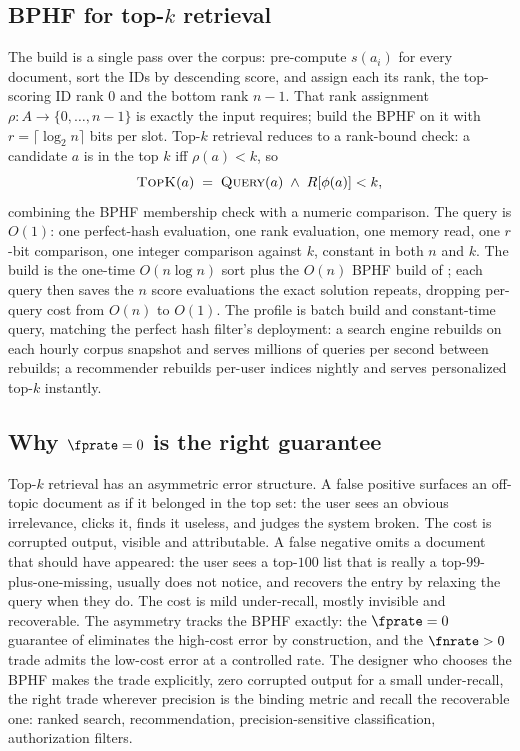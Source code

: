 \subsection*{BPHF for top-\texorpdfstring{$k$}{k} retrieval}

The build is a single pass over the corpus: pre-compute $s(a_i)$ for
every document, sort the IDs by descending score, and assign each its
rank, the top-scoring ID rank $0$ and the bottom rank $n - 1$. That rank
assignment $\rho : A \to \{0, \ldots, n-1\}$ is exactly the input
 requires; build the BPHF on it with $r =
\lceil \log_2 n \rceil$ bits per slot. Top-$k$ retrieval reduces to a
rank-bound check: a candidate $a$ is in the top $k$ iff $\rho(a) < k$, so
\[
  \textsc{TopK}(a) \;=\; \textsc{Query}(a) \;\land\; R[\phi(a)] < k,
\]
combining the BPHF membership check with a numeric comparison. The query
is $O(1)$: one perfect-hash evaluation, one rank evaluation, one memory
read, one $r$-bit comparison, one integer comparison against $k$,
constant in both $n$ and $k$. The build is the one-time $O(n \log n)$
sort plus the $O(n)$ BPHF build of ; each
query then saves the $n$ score evaluations the exact solution repeats,
dropping per-query cost from $O(n)$ to $O(1)$. The profile is batch build
and constant-time query, matching the perfect hash filter's deployment: a
search engine rebuilds on each hourly corpus snapshot and serves millions
of queries per second between rebuilds; a recommender rebuilds per-user
indices nightly and serves personalized top-$k$ instantly.

\subsection*{Why \texorpdfstring{$\fprate = 0$}{FPR = 0} is the right guarantee}

Top-$k$ retrieval has an asymmetric error structure. A false positive
surfaces an off-topic document as if it belonged in the top set: the user
sees an obvious irrelevance, clicks it, finds it useless, and judges the
system broken. The cost is corrupted output, visible and attributable. A
false negative omits a document that should have appeared: the user sees
a top-$100$ list that is really a top-$99$-plus-one-missing, usually does
not notice, and recovers the entry by relaxing the query when they do.
The cost is mild under-recall, mostly invisible and recoverable. The
asymmetry tracks the BPHF exactly: the $\fprate = 0$ guarantee of
 eliminates the high-cost error by construction, and the
$\fnrate > 0$ trade admits the low-cost error at a controlled rate. The
designer who chooses the BPHF makes the trade explicitly, zero corrupted
output for a small under-recall, the right trade wherever precision is
the binding metric and recall the recoverable one: ranked search,
recommendation, precision-sensitive classification, authorization
filters.

